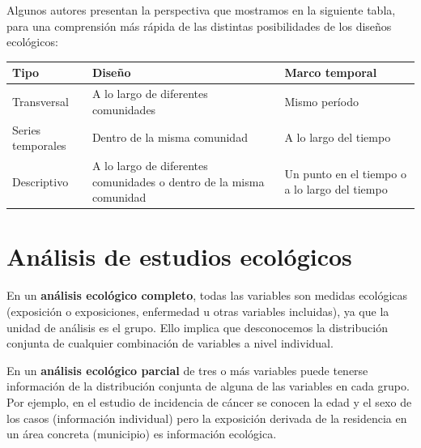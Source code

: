\documentclass[
  spanish,
  a4paper,
]{scrbook}
\newcounter{none} %
\begin{document}
Algunos autores presentan la perspectiva que mostramos en la siguiente
tabla, para una comprensión más rápida de las distintas posibilidades de
los diseños ecológicos:

{\def\LTcaptype{none} %
\begin{longtable}[]{@{}
  >{\raggedright\arraybackslash}p{}
  >{\raggedright\arraybackslash}p{}
  >{\raggedright\arraybackslash}p{}@{}}
\toprule\noalign{}
\begin{minipage}[b]{\linewidth}\raggedright
Tipo
\end{minipage} & \begin{minipage}[b]{\linewidth}\raggedright
Diseño
\end{minipage} & \begin{minipage}[b]{\linewidth}\raggedright
Marco temporal
\end{minipage} \\
\midrule\noalign{}
\endhead
\bottomrule\noalign{}
\endlastfoot
Transversal & A lo largo de diferentes comunidades & Mismo período \\
Series temporales & Dentro de la misma comunidad & A lo largo del
tiempo \\
Descriptivo & A lo largo de diferentes comunidades o dentro de la misma
comunidad & Un punto en el tiempo o a lo largo del tiempo \\
\end{longtable}
}

\section{Análisis de estudios
ecológicos}\label{anuxe1lisis-de-estudios-ecoluxf3gicos}

En un \textbf{análisis ecológico completo}, todas las variables son
medidas ecológicas (exposición o exposiciones, enfermedad u otras
variables incluidas), ya que la unidad de análisis es el grupo. Ello
implica que desconocemos la distribución conjunta de cualquier
combinación de variables a nivel individual.

En un \textbf{análisis ecológico parcial} de tres o más variables puede
tenerse información de la distribución conjunta de alguna de las
variables en cada grupo. Por ejemplo, en el estudio de incidencia de
cáncer se conocen la edad y el sexo de los casos (información
individual) pero la exposición derivada de la residencia en un área
concreta (municipio) es información ecológica.
\end{document}
